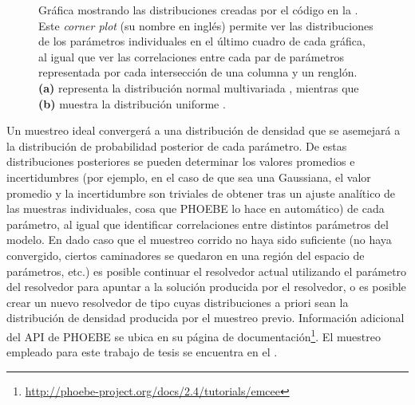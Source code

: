 \begin{figure}[!ht]
	\centering
	\caption{Gráfica mostrando las distribuciones creadas por el código en la
	. Este \textit{corner plot} (su nombre en
	inglés) permite ver las distribuciones de los parámetros individuales en el
	último cuadro de cada gráfica, al igual que ver las correlaciones entre cada
	par de parámetros representada por cada intersección de una columna y un
	renglón. \textbf{(a)} representa la distribución normal multivariada
	, mientras que \textbf{(b)} muestra la distribución uniforme
	.}
	\label{figuraPhoebeMuestreoPriors}
\end{figure}

Un muestreo ideal convergerá a una distribución de densidad que se asemejará a
la distribución de probabilidad posterior de cada parámetro. De estas
distribuciones posteriores se pueden determinar los valores promedios e
incertidumbres (por ejemplo, en el caso de que sea una Gaussiana, el valor
promedio y la incertidumbre son triviales de obtener tras un ajuste analítico de
las muestras individuales, cosa que PHOEBE lo hace en automático) de cada
parámetro, al igual que identificar correlaciones entre distintos parámetros del
modelo. En dado caso que el muestreo corrido no haya sido suficiente (no haya
convergido, ciertos caminadores se quedaron  en una región del
espacio de parámetros, etc.) es posible continuar el resolvedor actual
utilizando el parámetro del resolvedor  para apuntar a la
solución producida por el resolvedor, o es posible crear un nuevo resolvedor de
tipo  cuyas distribuciones a priori sean la distribución de
densidad producida por el muestreo previo. Información adicional del API de
PHOEBE se ubica en su página de
documentación\footnote{\url{http://phoebe-project.org/docs/2.4/tutorials/emcee}}.
El muestreo empleado para este trabajo de tesis se encuentra en el
.